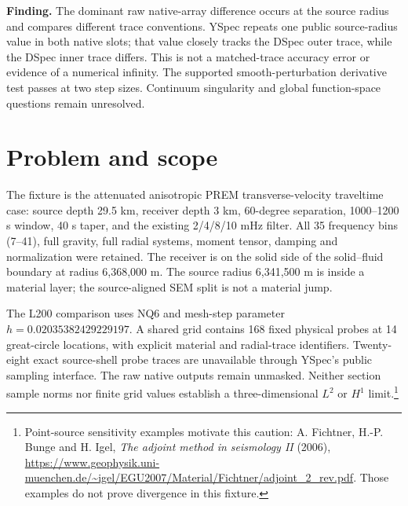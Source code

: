 \documentclass[11pt,a4paper]{article}
\begin{document}
\textbf{Finding.} The dominant raw native-array difference occurs at the source radius and compares different trace conventions. YSpec repeats one public source-radius value in both native slots; that value closely tracks the DSpec outer trace, while the DSpec inner trace differs. This is not a matched-trace accuracy error or evidence of a numerical infinity. The supported smooth-perturbation derivative test passes at two step sizes. Continuum singularity and global function-space questions remain unresolved.

\section{Problem and scope}
The fixture is the attenuated anisotropic PREM transverse-velocity traveltime case: source depth 29.5 km, receiver depth 3 km, 60-degree separation, 1000--1200 s window, 40 s taper, and the existing 2/4/8/10 mHz filter. All 35 frequency bins (7--41), full gravity, full radial systems, moment tensor, damping and normalization were retained. The receiver is on the solid side of the solid--fluid boundary at radius 6,368,000 m. The source radius 6,341,500 m is inside a material layer; the source-aligned SEM split is not a material jump.

The L200 comparison uses NQ6 and mesh-step parameter $h=0.02035382429229197$. A shared grid contains 168 fixed physical probes at 14 great-circle locations, with explicit material and radial-trace identifiers. Twenty-eight exact source-shell probe traces are unavailable through YSpec's public sampling interface. The raw native outputs remain unmasked. Neither section sample norms nor finite grid values establish a three-dimensional $L^2$ or $H^1$ limit.\footnote{Point-source sensitivity examples motivate this caution: A. Fichtner, H.-P. Bunge and H. Igel, \emph{The adjoint method in seismology II} (2006), \url{https://www.geophysik.uni-muenchen.de/~igel/EGU2007/Material/Fichtner/adjoint_2_rev.pdf}. Those examples do not prove divergence in this fixture.}
\end{document}
